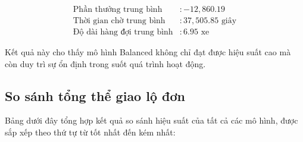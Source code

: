 \begin{align}
    \text{Phần thưởng trung bình}     & : -12,860.19             \\
    \text{Thời gian chờ trung bình}   & : 37,505.85 \text{ giây} \\
    \text{Độ dài hàng đợi trung bình} & : 6.95 \text{ xe}
\end{align}

Kết quả này cho thấy mô hình Balanced không chỉ đạt được hiệu suất cao mà còn duy
trì sự ổn định trong suốt quá trình hoạt động.

\subsection{So sánh tổng thể giao lộ đơn}

Bảng dưới đây tổng hợp kết quả so sánh hiệu suất của tất cả các mô hình, được sắp
xếp theo thứ tự từ tốt nhất đến kém nhất:

